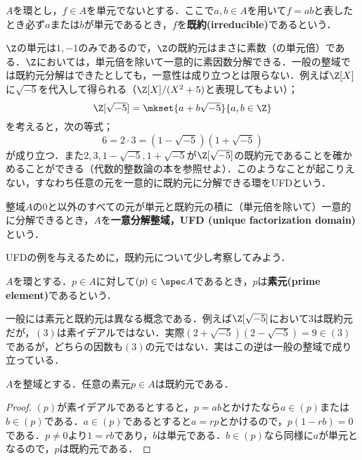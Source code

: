 \begin{defi}[既約元]\label{defi:既約元}
	$A$を環とし，$f\in A$を単元でないとする．ここで$a,b\in A$を用いて$f=ab$と表したとき必ず$a$または$b$が単元であるとき，$f$を\textbf{既約(irreducible)}であるという．
\end{defi}

$\Z$の単元は$1,-1$のみであるので，$\Z$の既約元はまさに素数（の単元倍）である．$\Z$においては，単元倍を除いて一意的に素因数分解できる．一般の整域では既約元分解はできたとしても，一意性は成り立つとは限らない．例えば$\Z[X]$に$\sqrt{-5}$を代入して得られる（$\Z[X]/(X^2+5)$と表現してもよい）；
\[\Z[\sqrt{-5}]=\mkset{a+b\sqrt{-5}}{a,b\in\Z}\]
を考えると，次の等式；
\[6=2\cdot 3=(1-\sqrt{-5})(1+\sqrt{-5})\]
が成り立つ．また$2,3,1-\sqrt{-5},1+\sqrt{-5}$が$\Z[\sqrt{-5}]$の既約元であることを確かめることができる（代数的整数論の本を参照せよ）．このようなことが起こりえない，すなわち任意の元を一意的に既約元に分解できる環をUFDという．

\begin{defi}[UFD]
	整域$A$の$0$と以外のすべての元が単元と既約元の積に（単元倍を除いて）一意的に分解できるとき，$A$を\textbf{一意分解整域，UFD (unique factorization domain)}という．
\end{defi}

UFDの例を与えるために，既約元について少し考察してみよう．

\begin{defi}[素元]
	$A$を環とする．$p\in A$に対して$(p)\in\spec A$であるとき，$p$は\textbf{素元(prime element)}であるという．
\end{defi}

一般には素元と既約元は異なる概念である．例えば$\Z[\sqrt{-5}]$において$3$は既約元だが，$(3)$は素イデアルではない．実際$(2+\sqrt{-5})(2-\sqrt{-5})=9\in (3)$であるが，どちらの因数も$(3)$の元ではない．実はこの逆は一般の整域で成り立っている．

\begin{prop}\label{prop:素元は既約}
	$A$を整域とする．任意の素元$p\in A$は既約元である．
\end{prop}

\begin{proof}
	$(p)$が素イデアルであるとすると，$p=ab$とかけたなら$a\in (p)$または$b\in(p)$である．$a\in (p)$であるとすると$a=rp$とかけるので，$p(1-rb)=0$である．$p\neq0$より$1=rb$であり，$b$は単元である．$b\in (p)$なら同様に$a$が単元となるので，$p$は既約元である．
\end{proof}

